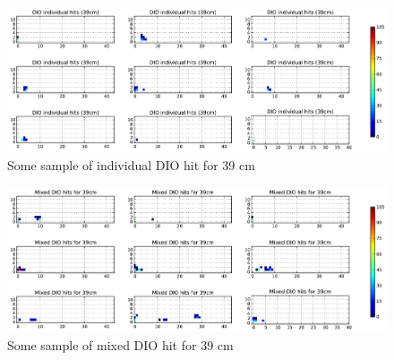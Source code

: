 \documentclass[11pt]{article}
\begin{document}
\begin{figure}[htbp]
   \centering
   \includegraphics[width=\textwidth]{../plot/dio_sample_hit_39.pdf} %
   \caption{Some sample of individual DIO hit for 39 cm}
   \label{fig:dio_sample_hit_39}
\end{figure}

\begin{figure}[htbp]
   \centering
   \includegraphics[width=\textwidth]{../plot/mixed_dio_sample_hit_39.pdf} %
   \caption{Some sample of mixed DIO hit for 39 cm}
   \label{fig:mixed_dio_sample_hit_39}
\end{figure}
\end{document}
